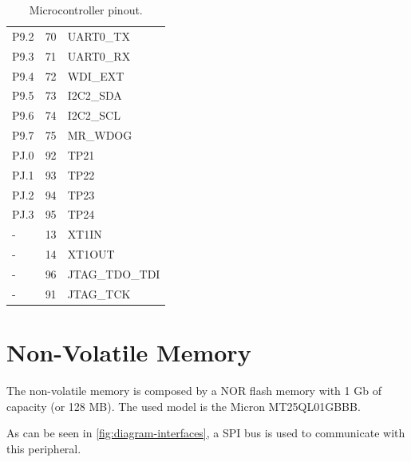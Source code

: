 \begin{table}[!h]
\begin{tabular}{lcl}
        P9.2              & 70                  & UART0\_TX             \\
        P9.3              & 71                  & UART0\_RX             \\
        P9.4              & 72                  & WDI\_EXT              \\
        P9.5              & 73                  & I2C2\_SDA             \\
        P9.6              & 74                  & I2C2\_SCL             \\
        P9.7              & 75                  & MR\_WDOG              \\
        \midrule
        PJ.0              & 92                  & TP21                  \\
        PJ.1              & 93                  & TP22                  \\
        PJ.2              & 94                  & TP23                  \\
        PJ.3              & 95                  & TP24                  \\
        \midrule
        -                 & 13                  & XT1IN                 \\
        -                 & 14                  & XT1OUT                \\
        -                 & 96                  & JTAG\_TDO\_TDI        \\
        -                 & 91                  & JTAG\_TCK             \\
        \bottomrule[1.5pt]
    \end{tabular}
    \caption{Microcontroller pinout.}
    \label{tab:mcu-pinout}
\end{table}

\section{Non-Volatile Memory}

The non-volatile memory is composed by a NOR flash memory with 1 Gb of capacity (or 128 MB). The used model is the Micron MT25QL01GBBB.

As can be seen in \autoref{fig:diagram-interfaces}, a SPI bus is used to communicate with this peripheral.
